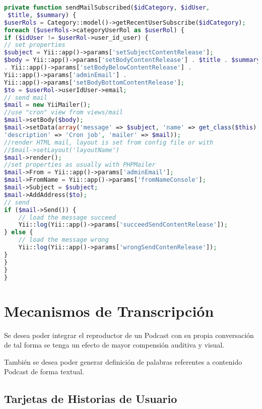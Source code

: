 \begin{enumerate}
\begin{lstlisting}[language = PHP]
private function sendMailSubscribed($idCategory, $idUser,
 $title, $summary) {
$userRols = Category::model()->getRecentUserSubscribe($idCategory);
foreach ($userRols->categoryUserRol as $userRol) {
if ($idUser != $userRol->user_id_user) {
// set properties
$subject = Yii::app()->params['setSubjectContentRelease'];
$body = Yii::app()->params['setBodyContentRelease'] . $title . $summary
. Yii::app()->params['setBodyBelowContentRelease'] . 
Yii::app()->params['adminEmail'] . 
Yii::app()->params['setBodyBottomContentRelease'];
$to = $userRol->userIdUser->email;
// send mail
$mail = new YiiMailer();
//use "cron" view from views/mail
$mail->setBody($body);
$mail->setData(array('message' => $subject, 'name' => get_class($this),
'description' => 'Cron job', 'mailer' => $mail));
//render HTML mail, layout is set from config file or with 
//$mail->setLayout('layoutName')
$mail->render();
//set properties as usually with PHPMailer
$mail->From = Yii::app()->params['adminEmail'];
$mail->FromName = Yii::app()->params['fromNameConsole'];
$mail->Subject = $subject;
$mail->AddAddress($to);
// send
if ($mail->Send()) {
	// load the message succeed
    Yii::log(Yii::app()->params['succeedSendContentRelease']);
} else {
	// load the message wrong
    Yii::log(Yii::app()->params['wrongSendContenRelease']);
}
}
}
}    
\end{lstlisting}

\end{enumerate}

\section{Mecanismos de Transcripci\'{o}n}

Se desea poder integrar el reproductor de un Podcast con su propia conversaci\'{o}n
de tal forma se tenga un efecto de mayor compensi\'{o}n auditiva y visual.

Tambi\'{e}n se desea poder generar definici\'{o}n de palabras referentes a contenido
Podcast de forma textual.
 
\subsection{Tarjetas de Historias de Usuario}

